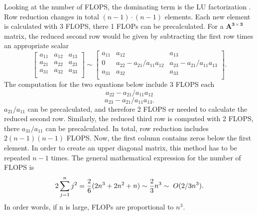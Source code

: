 \documentclass[%
oneside,                 %
final,                   %
10pt]{article}
\begin{document}
Looking at the number of FLOPS, the dominating term is the LU factorization \cite{FYS3150LectureNotes}.
Row reduction changes in total $(n-1) \cdot (n-1)$ elements. Each new element is calculated with 3 FLOPS, there 1 FLOPs can be precalculated. 
For a $\mathbf{A^{3 \times 3}}$ matrix, the reduced second row would be given by subtracting the first row times an appropriate scalar
\[
     \begin{bmatrix}
                           a_{11}	& a_{12} & a_{13} \\
                           a_{21} & a_{22} & a_{23}  \\
                           a_{31} & a_{32} & a_{33}  \\
                      \end{bmatrix}
  \sim \begin{bmatrix}
                           a_{11}	& a_{12} & a_{13} \\
                           0 & a_{22}-a_{21}/a_{11}a_{12} & a_{23}-a_{21}/a_{11}a_{13}  \\
                           a_{31} & a_{32} & a_{33}  \\
                      \end{bmatrix}  .
\]
The computation for the two equations below include 3 FLOPS each 
\begin{equation*}
 a_{22}-a_{21}/a_{11}a_{12} 
 \end{equation*}
 \begin{equation*}
  a_{23}-a_{21}/a_{11}a_{13}.
 \end{equation*}
$a_{21}/a_{11}$ can be precalculated, and therefore 2 FLOPS er needed to calculate the reduced second row. 
Similarly, the reduced third row is computed with 2 FLOPS, there $a_{31}/a_{11}$ can be precalculated.
In total, row reduction includes $2(n-1)(n-1)$ FLOPS. Now, the first column contains zeros below the first element. 
In order to create an upper diagonal matrix, this method has to be repeated $n-1$ times. 
The general mathematical expression for the number of FLOPS is
\begin{equation}
2 \sum_{j=1}^{n}j^2 = \frac{2}{6}(2n^3+2n^2+n) \sim \frac{2}{3}n^3 \sim \hspace{0.1cm} O(2/3n^3).
\end{equation}
In order words, if n is large, FLOPs are proportional to $n^3$.
\end{document}

